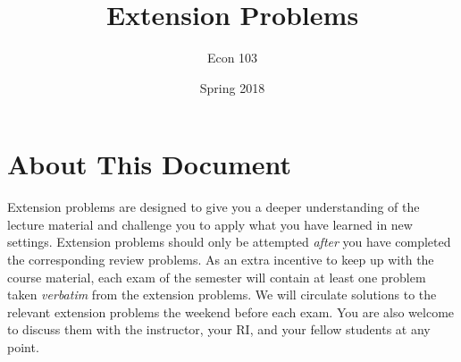 \documentclass[addpoints,12pt]{exam}
\title{Extension Problems}
\author{Econ 103}
\date{Spring 2018}
\begin{document}
\maketitle

\section*{About This Document}
Extension problems are designed to give you a deeper understanding of the lecture material and challenge you to apply what you have learned in new settings.
Extension problems should only be attempted \emph{after} you have completed the corresponding review problems.
As an extra incentive to keep up with the course material, each exam of the semester will contain at least one problem taken \emph{verbatim} from the extension problems. 
We will circulate solutions to the relevant extension problems the weekend before each exam.
You are also welcome to discuss them with the instructor, your RI, and your fellow students at any point.



\end{document}
